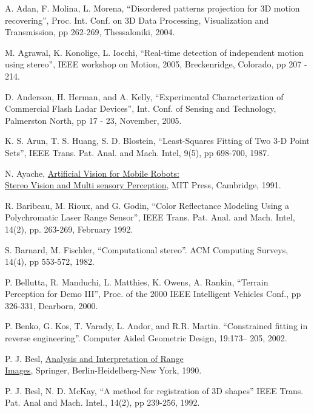 \documentclass[twocolumn,oneside]{book}
\begin{document}

\begin{thebibliography}{99}

A. Adan, F. Molina, L. Morena, 
``Disordered patterns projection for 3D motion recovering'',
Proc. Int. Conf. on 
3D Data Processing, Visualization and Transmission, pp 262-269, Thessaloniki, 2004.

M. Agrawal, K. Konolige, L. Iocchi,
``Real-time detection of independent motion using stereo'', 
IEEE workshop on Motion, 2005, Breckenridge, Colorado, pp 207 - 214.

D. Anderson, H. Herman, and A. Kelly,
``Experimental Characterization of Commercial Flash Ladar Devices'',
Int. Conf. of Sensing and Technology, Palmerston North, pp 17 - 23, November, 2005. 

K. S. Arun, T. S. Huang, S. D. Blostein,
``Least-Squares Fitting of Two 3-D Point Sets'', 
IEEE Trans. Pat. Anal. and Mach. Intel, 9(5), pp 698-700, 1987.

N. Ayache,
{\underline {Artificial Vision for Mobile Robots:}}\\{\underline {Stereo Vision and Multi sensory Perception}},
MIT Press, Cambridge, 1991.

R. Baribeau, M. Rioux, and G. Godin, 
``Color Reflectance Modeling Using a Polychromatic Laser Range Sensor'',
IEEE Trans. Pat. Anal. and Mach. Intel, 14(2), pp. 263-269, February 1992.

S. Barnard, M. Fischler,
``Computational stereo''.
ACM Computing Surveys, 14(4), pp 553-572, 1982.

P. Bellutta, R. Manduchi, L. Matthies, K. Owens, A. Rankin, 
``Terrain Perception for Demo III'', 
Proc. of the 2000 IEEE Intelligent Vehicles Conf., pp 326-331, Dearborn, 2000.

P. Benko, G. Kos, T. Varady, L. Andor, and R.R. Martin.
``Constrained fitting in reverse engineering''. 
Computer Aided Geometric Design, 19:173-- 205, 2002.

P. J. Besl,
{\underline{Analysis and Interpretation of Range}}\\{\underline {Images}},
Springer, Berlin-Heidelberg-New York, 1990.

P. J. Besl, N. D. McKay,
``A method for registration of 3D shapes''
IEEE Trans. Pat. Anal and Mach. Intel., 14(2), pp 239-256, 1992.


\end{thebibliography}
\end{document}
